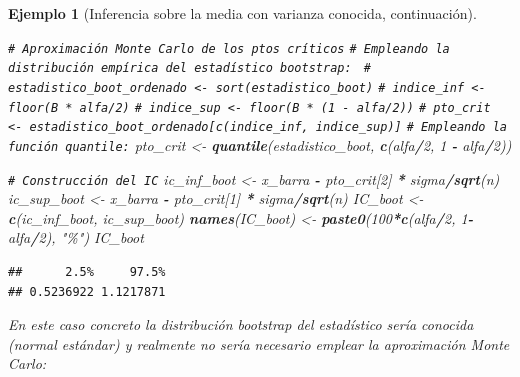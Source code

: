 \documentclass[
]{book}
\newenvironment{Shaded}{\begin{snugshade}}{\end{snugshade}}
\newcommand{\CommentTok}[1]{\textcolor[rgb]{0.56,0.35,0.01}{\textit{#1}}}
\newcommand{\DecValTok}[1]{\textcolor[rgb]{0.00,0.00,0.81}{#1}}
\newcommand{\FunctionTok}[1]{\textcolor[rgb]{0.13,0.29,0.53}{\textbf{#1}}}
\newcommand{\NormalTok}[1]{#1}
\newcommand{\OtherTok}[1]{\textcolor[rgb]{0.56,0.35,0.01}{#1}}
\newcommand{\SpecialCharTok}[1]{\textcolor[rgb]{0.81,0.36,0.00}{\textbf{#1}}}
\newcommand{\StringTok}[1]{\textcolor[rgb]{0.31,0.60,0.02}{#1}}
\theoremstyle{break}
\newtheorem{example}{Ejemplo}[chapter]
\theoremstyle{nonumberplain}
\renewcommand{\CommentTok}[1]{\textcolor[rgb]{0.41,0.41,0.41}{\texttt{#1}}}
\begin{document}
\begin{example}[Inferencia sobre la media con varianza conocida, continuación]
\begin{Shaded}
\begin{Highlighting}[]
\CommentTok{\# Aproximación Monte Carlo de los ptos críticos}
\CommentTok{\# Empleando la distribución empírica del estadístico bootstrap: }
    \CommentTok{\# estadistico\_boot\_ordenado \textless{}{-} sort(estadistico\_boot)}
    \CommentTok{\# indice\_inf \textless{}{-} floor(B * alfa/2)}
    \CommentTok{\# indice\_sup \textless{}{-} floor(B * (1 {-} alfa/2))}
    \CommentTok{\# pto\_crit \textless{}{-} estadistico\_boot\_ordenado[c(indice\_inf, indice\_sup)]}
\CommentTok{\# Empleando la función \textasciigrave{}quantile\textasciigrave{}:}
\NormalTok{pto\_crit }\OtherTok{\textless{}{-}} \FunctionTok{quantile}\NormalTok{(estadistico\_boot, }\FunctionTok{c}\NormalTok{(alfa}\SpecialCharTok{/}\DecValTok{2}\NormalTok{, }\DecValTok{1} \SpecialCharTok{{-}}\NormalTok{ alfa}\SpecialCharTok{/}\DecValTok{2}\NormalTok{))}

\CommentTok{\# Construcción del IC}
\NormalTok{ic\_inf\_boot }\OtherTok{\textless{}{-}}\NormalTok{ x\_barra }\SpecialCharTok{{-}}\NormalTok{ pto\_crit[}\DecValTok{2}\NormalTok{] }\SpecialCharTok{*}\NormalTok{ sigma}\SpecialCharTok{/}\FunctionTok{sqrt}\NormalTok{(n)}
\NormalTok{ic\_sup\_boot }\OtherTok{\textless{}{-}}\NormalTok{ x\_barra }\SpecialCharTok{{-}}\NormalTok{ pto\_crit[}\DecValTok{1}\NormalTok{] }\SpecialCharTok{*}\NormalTok{ sigma}\SpecialCharTok{/}\FunctionTok{sqrt}\NormalTok{(n)}
\NormalTok{IC\_boot }\OtherTok{\textless{}{-}} \FunctionTok{c}\NormalTok{(ic\_inf\_boot, ic\_sup\_boot)}
\FunctionTok{names}\NormalTok{(IC\_boot) }\OtherTok{\textless{}{-}} \FunctionTok{paste0}\NormalTok{(}\DecValTok{100}\SpecialCharTok{*}\FunctionTok{c}\NormalTok{(alfa}\SpecialCharTok{/}\DecValTok{2}\NormalTok{, }\DecValTok{1}\SpecialCharTok{{-}}\NormalTok{alfa}\SpecialCharTok{/}\DecValTok{2}\NormalTok{), }\StringTok{"\%"}\NormalTok{)}
\NormalTok{IC\_boot}
\end{Highlighting}
\end{Shaded}

\begin{verbatim}
##      2.5%     97.5% 
## 0.5236922 1.1217871
\end{verbatim}

En este caso concreto la distribución bootstrap del estadístico sería conocida (normal estándar) y realmente no sería necesario emplear la aproximación Monte Carlo:


\end{example}
\end{document}
